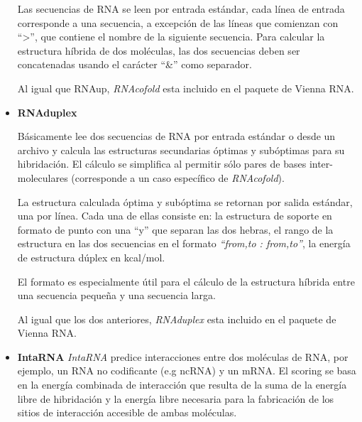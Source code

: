 \documentclass[12pt,a4paper,spanish]{article}
\begin{document}
\begin{itemize}
            \par Las secuencias de RNA se leen por entrada estándar, cada línea de entrada corresponde a una
            secuencia, a excepción de las líneas que comienzan con ``>'', que contiene el nombre de la
            siguiente secuencia. Para calcular la estructura híbrida de dos moléculas, las dos secuencias
            deben ser concatenadas usando el carácter ``\&'' como separador. 
            
            \par Al igual que RNAup, \emph{RNAcofold} esta incluido en el paquete de Vienna 
            RNA\cite{11}.             

    \item \textbf{RNAduplex} 
            \par Básicamente lee dos secuencias de RNA por entrada estándar o desde un archivo y calcula
            las estructuras secundarias óptimas y subóptimas para su hibridación. El cálculo se simplifica al
            permitir sólo pares de bases inter-moleculares (corresponde a un caso específico de
            \emph{RNAcofold}). 

            \par La estructura calculada óptima y subóptima se retornan por salida estándar, una por
             línea. Cada una de ellas consiste en: la estructura de soporte en formato de punto con una ``y''
             que separan las dos hebras, el rango de la estructura en las dos secuencias en el formato 
             \emph{``from,to : from,to''}, la energía de estructura dúplex en kcal/mol.

             \par El formato es especialmente útil para el cálculo de la estructura híbrida entre una
             secuencia pequeña y una secuencia larga.

             \par Al igual que los dos anteriores, \emph{RNAduplex} esta incluido en el paquete de Vienna
             RNA\cite{11}.         

    \item \textbf{IntaRNA} 
            \emph{IntaRNA}\cite{12} predice interacciones entre dos moléculas de RNA, por ejemplo, un RNA no
             codificante (e.g ncRNA) y un mRNA. El scoring se basa en la energía combinada de interacción que
             resulta de la suma de la energía libre de hibridación y la energía libre necesaria para la
             fabricación de los sitios de interacción accesible de ambas moléculas.


\end{itemize}
\end{document}
